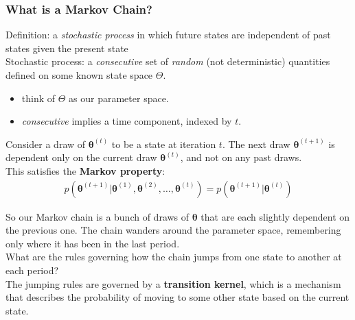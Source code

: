 \documentclass[handout]{beamer}
\begin{document}
\begin{frame}
\frametitle{What is a Markov Chain?}
\pause
Definition: a \textit{stochastic process} in which future states are
independent of past states given the present state\\
\bigskip
\pause
Stochastic process: a \textit{consecutive} set of \textit{random} (not
deterministic) quantities defined on some known state space $\Theta$.
\pause
\begin{itemize}
\item think of $\Theta$ as our parameter space.
\pause
\item \textit{consecutive} implies a time component, indexed by $t$.
\end{itemize}
\pause
\bigskip
Consider a draw of $\bm{\theta}^{(t)}$ to be a state at iteration $t$.  The next
draw $\bm{\theta}^{(t+1)}$ is dependent only on the current draw
$\bm{\theta}^{(t)}$, and not on any past draws.\\
\pause 
\bigskip
This satisfies the \textbf{Markov property}:
\pause
\begin{eqnarray*}
p(\bm{\theta}^{(t+1)} | \bm{\theta}^{(1)}, \bm{\theta}^{(2)}, \dots,
\bm{\theta}^{(t)}) = p(\bm{\theta}^{(t+1)} | \bm{\theta}^{(t)})
\end{eqnarray*}
\end{frame}

\begin{frame}
So our Markov chain is a bunch of draws of $\bm{\theta}$ that are each
slightly dependent on the previous one.  \pause The chain wanders
around the parameter space, remembering only where it has been in the
last period.\\
\pause
\bigskip
What are the rules governing how the chain jumps from one state to
another at each period?\\
\pause
\bigskip
The jumping rules are governed by a \textbf{transition kernel}, which
is a mechanism that describes the probability of moving to some other
state based on the current state. 
\end{frame}
\end{document}
